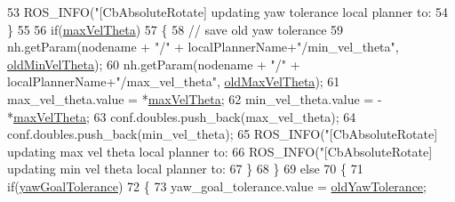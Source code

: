 \begin{DoxyCode}
53             ROS\_INFO(\textcolor{stringliteral}{"[CbAbsoluteRotate] updating yaw tolerance local planner to: %
54        \}
55 
56        \textcolor{keywordflow}{if}(\hyperlink{classcl__move__base__z_1_1CbAbsoluteRotate_ac0018b01a202dd805e3d3b50ed205d23}{maxVelTheta})
57        \{
58             \textcolor{comment}{// save old yaw tolerance}
59             nh.getParam(nodename + \textcolor{stringliteral}{"/"}  + localPlannerName+\textcolor{stringliteral}{"/min\_vel\_theta"}, 
      \hyperlink{classcl__move__base__z_1_1CbAbsoluteRotate_a280721d1887e622330ee3ac44b7e84d5}{oldMinVelTheta});
60             nh.getParam(nodename + \textcolor{stringliteral}{"/"}  + localPlannerName+\textcolor{stringliteral}{"/max\_vel\_theta"}, 
      \hyperlink{classcl__move__base__z_1_1CbAbsoluteRotate_a131095d57ad3fd423bb9eaebebf61cc9}{oldMaxVelTheta});
61             max\_vel\_theta.value = *\hyperlink{classcl__move__base__z_1_1CbAbsoluteRotate_ac0018b01a202dd805e3d3b50ed205d23}{maxVelTheta};
62             min\_vel\_theta.value = -*\hyperlink{classcl__move__base__z_1_1CbAbsoluteRotate_ac0018b01a202dd805e3d3b50ed205d23}{maxVelTheta};
63             conf.doubles.push\_back(max\_vel\_theta);
64             conf.doubles.push\_back(min\_vel\_theta);
65             ROS\_INFO(\textcolor{stringliteral}{"[CbAbsoluteRotate] updating max vel theta local planner to: %
66             ROS\_INFO(\textcolor{stringliteral}{"[CbAbsoluteRotate] updating min vel theta local planner to: %
67        \}
68     \}
69     \textcolor{keywordflow}{else}
70     \{
71         \textcolor{keywordflow}{if}(\hyperlink{classcl__move__base__z_1_1CbAbsoluteRotate_a8d8b5b9c2c821efe101bb07c96c4bdd3}{yawGoalTolerance})
72         \{
73             yaw\_goal\_tolerance.value = \hyperlink{classcl__move__base__z_1_1CbAbsoluteRotate_a2cfcd2978e7923494e2e66107e134e27}{oldYawTolerance};
}}}
\end{DoxyCode}
